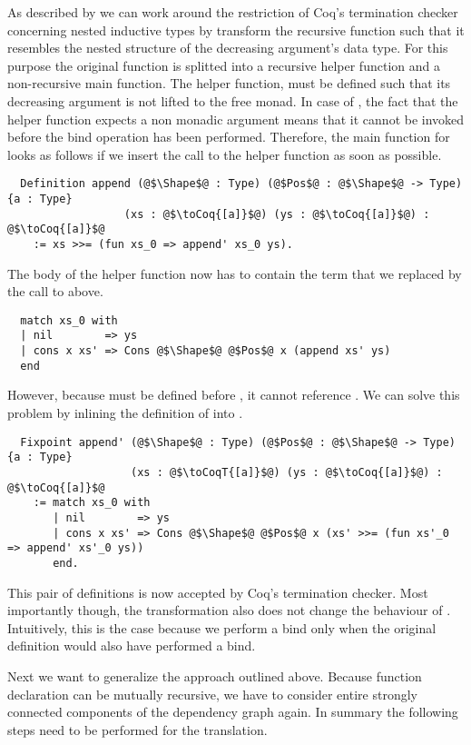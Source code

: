 As described by \cite{Dylus:2018} we can work around the restriction of Coq's termination checker concerning nested inductive types by transform the recursive function such that it resembles the nested structure of the decreasing argument's data type.
For this purpose the original function is splitted into a recursive helper function and a non-recursive main function.
The helper function, must be defined such that its decreasing argument is not lifted to the free monad.
In case of , the fact that the helper function  expects a non monadic argument means that it cannot be invoked before the bind operation has been performed.
Therefore, the main function for  looks as follows if we insert the call to the helper function as soon as possible.
\begin{verbatim}
  Definition append (@$\Shape$@ : Type) (@$Pos$@ : @$\Shape$@ -> Type) {a : Type}
                  (xs : @$\toCoq{[a]}$@) (ys : @$\toCoq{[a]}$@) : @$\toCoq{[a]}$@
    := xs >>= (fun xs_0 => append' xs_0 ys).
\end{verbatim}
The body of the helper function now has to contain the  term that we replaced by the call to  above.
\begin{verbatim}
  match xs_0 with
  | nil        => ys
  | cons x xs' => Cons @$\Shape$@ @$Pos$@ x (append xs' ys)
  end
\end{verbatim}
However, because  must be defined before , it cannot reference .
We can solve this problem by inlining the definition of  into .
\begin{verbatim}
  Fixpoint append' (@$\Shape$@ : Type) (@$Pos$@ : @$\Shape$@ -> Type) {a : Type}
                   (xs : @$\toCoqT{[a]}$@) (ys : @$\toCoq{[a]}$@) : @$\toCoq{[a]}$@
    := match xs_0 with
       | nil        => ys
       | cons x xs' => Cons @$\Shape$@ @$Pos$@ x (xs' >>= (fun xs'_0 => append' xs'_0 ys))
       end.
\end{verbatim}
This pair of definitions is now accepted by Coq's termination checker.
Most importantly though, the transformation also does not change the behaviour of .
Intuitively, this is the case because we perform a bind only when the original definition would also have performed a bind.

Next we want to generalize the approach outlined above.
Because function declaration can be mutually recursive, we have to consider entire strongly connected components of the dependency graph again.
In summary the following steps need to be performed for the translation.

